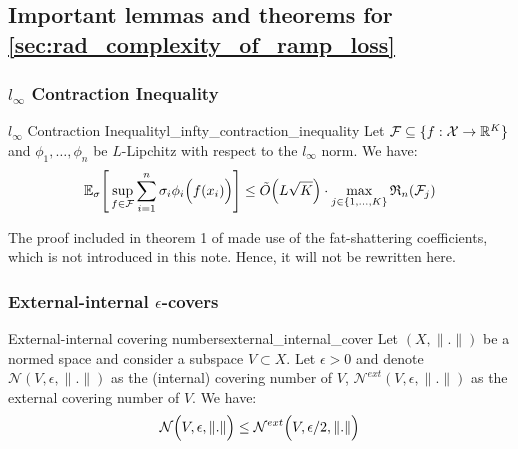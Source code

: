 \subsection{Important lemmas and theorems for \ref{sec:rad_complexity_of_ramp_loss}}
\subsubsection{$l_\infty$ Contraction Inequality}
\begin{theorem}{$l_\infty$ Contraction Inequality}{l_infty_contraction_inequality}
    Let $\mathcal{F}\subseteq\{f:\mathcal{X} \to \mathbb{R}^K\}$ and $\phi_1, \dots, \phi_n$ be $L$-Lipchitz with respect to the $l_\infty$ norm. We have:
    \begin{align*}
        \mathbb{E}_\sigma\Bigg[ 
            \sup_{f\in\mathcal{F}}\sum_{i=1}^n \sigma_i\phi_i\Big( f(x_i) \Big) 
         \Bigg]\le \tilde O\Big( L\sqrt K \Big)\cdot\max_{j\in\{1, \dots, K\}} \mathfrak{R}_n(\mathcal{F}_j)
    \end{align*}
\end{theorem}

\begin{proof*}
    The proof included in theorem 1 of \cite{article:foster} made use of the fat-shattering coefficients, which is not introduced in this note. Hence, it will not be rewritten here.
\end{proof*}


\subsubsection{External-internal $\epsilon$-covers}
\begin{lemma}{External-internal covering numbers}{external_internal_cover}
    Let $(X, \|.\|)$ be a normed space and consider a subspace $V\subset X$. Let $\epsilon > 0$ and denote $\mathcal{N}(V, \epsilon, \|.\|)$ as the (internal) covering number of $V$, $\mathcal{N}^{ext}(V, \epsilon, \|.\|)$ as the external covering number of $V$. We have:
    \begin{align*}
        \mathcal{N}\Big( V, \epsilon, \|.\| \Big) \le \mathcal{N}^{ext}\Big( V, \epsilon/2, \|.\| \Big)
    \end{align*} 
\end{lemma}


